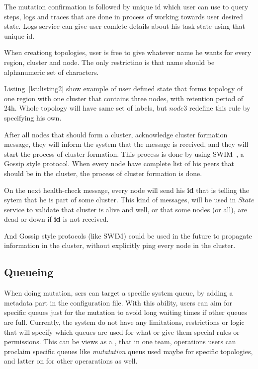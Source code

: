 The mutation confirmation is followed by unique id which user can use to query steps, logs and traces that are done in process of working towards user desired state. Logs service can give user comlete details about his task state using that unique id.

When creationg topologies, user is free to give whatever name he wants for every region, cluster and node. The only restrictino is that name should be alphanumeric set of characters.

Listing~\ref{lst:listing2} show example of user defined state that forms topology of one region with one cluster that contains three nodes, with retention period of 24h. Whole topology will have same set of labels, but $node3$ redefine this rule by specifying his own.



After all nodes that should form a cluster, acknowledge cluster formation message, they will inform the system that the message is received, and they will start the process of cluster formation. This process is done by using SWIM~\cite{DasGM02}, a Gossip style protocol. When every node have complete list of his peers that should be in the cluster, the process of cluster formation is done. 

On the next health-check message, every node will send his \textbf{id} that is telling the sytem that he is part of some cluster. This kind of messages, will be used in $State$ service to validate that cluster is alive and well, or that some nodes (or all), are dead or down if \textbf{id} is not received. 

And Gossip style protocols (like SWIM) could be used in the future to propagate information in the cluster, without explicitly ping every node in the cluster.
%
%
\subsection{Queueing}\label{sec:queueing}
%
When doing mutation, sers can target a specific system queue, by adding a metadata part in the configuration file. With this ability, users can aim for specific queues just for the mutation to avoid long waiting times if other queues are full. Currently, the system do not have any limitations, restrictions or logic that will specify which queues are used for what or give them special rules or permissions. This can be views as a , that in one team, operations users can proclaim specific queues like \textit{mutatation} queus used maybe for specific topologies, and latter on for other operarations as well.

